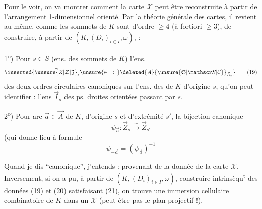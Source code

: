 Pour le voir, on va montrer comment la
carte $\mathcal X$ peut être reconstruite à partir de
l'arrangement 1-dimensionnel orienté. Par la
théorie générale des cartes, il revient au même,
 comme les sommets de $K$ sont d'ordre
$\geq4$ (\deleted{\unsure{$\geq$}}à fortiori $\geq3$), de construire, à partir
de $(K,(D_i)_{i\in I},\omega)$, :

1\textsuperscript{o}) Pour  $s\in S$ (ens. des sommets de $K$) 
l'ens. \[\inserted{\vec{\unsure{Z|\mathcal Z|\mathfrak Z}}_s\unsure{\in|\subset}\deleted{A}{\unsure{\mathfrak S|\mathscr S|\mathcal C}}_{\vec A_s}}\tag*{(19)}\] des deux ordres circulaires 
canoniques sur l'ens.  des  de $K$ d'origine
$s$, qu'on peut identifier   : l'ens
$\vec I_s$ des ps. droites \uline{orientées}  passant par $s$.

2\textsuperscript{o}) Pour   arc $\vec a\in\vec A$ de $K$, d'origine
$s$ et d'extrémité $s'$, la bijection canonique
\[\psi_{\vec a}:\vec Z_s\xrightarrow{\sim}\vec Z_{s'}\tag*{(20)}\]
(qui donne lieu à  formule
\[\psi_{-\vec a}=(\psi_{\vec a})^{-1}\tag*{(21)}\]

Quand je dis ``canonique'', j'entends :
provenant de la donnée de la carte $\mathcal X$.
Inversement, si on a pu, à partir de $(K,(D_i)_{i\in I},\omega)$,
construire intrinsèqu\textsuperscript{t} des données
(19) et (20) satisfaisant (21), on trouve une
immersion cellulaire combinatoire de
$K$ dans un $\mathcal X$ (peut être pas le plan projectif !).
